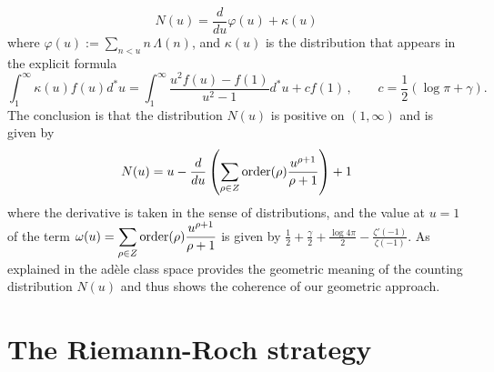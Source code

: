 \documentclass[graybox, envcountsect%
]{svmult}
\begin{document}
\begin{equation}\label{Nu}
    N(u)=\frac{d}{du}\varphi(u)+ \kappa(u)
\end{equation}
where $ \varphi(u):=\sum_{n<u}n\,\Lambda(n)$,  and $\kappa(u)$ is the distribution
that appears in the explicit formula
$$
\int_1^\infty\kappa(u)f(u)d^*u=\int_1^\infty\frac{u^2f(u)-f(1)}{u^2-1}d^*u+cf(1)\,, \qquad c=\frac12(\log\pi+\gamma).
$$
The conclusion is that the distribution $N(u)$ is positive on $(1,\infty)$ and  is given  by
\begin{equation}\label{fin2}
    N(u)=u-\frac{d}{du}\left(\sum_{\rho\in Z}{\rm order}(\rho)\frac{u^{\rho+1}}{\rho+1}\right)+1
\end{equation}
where the derivative is taken in the sense of distributions, and the value at $u=1$ of the  term
 $\displaystyle{\omega(u)=\sum_{\rho\in Z}{\rm order}(\rho)\frac{u^{\rho+1}}{\rho+1}}$ is given  by
$\frac 12+ \frac \gamma 2+\frac{\log4\pi}{2}-\frac{\zeta'(-1)}{\zeta(-1)}
$.\newline
As explained in \cite{CC0.5} the ad\`ele class space provides the geometric meaning of the counting distribution $N(u)$ and thus shows the coherence of our geometric approach.


\section{The Riemann-Roch strategy}\label{sec:3}
\end{document}
